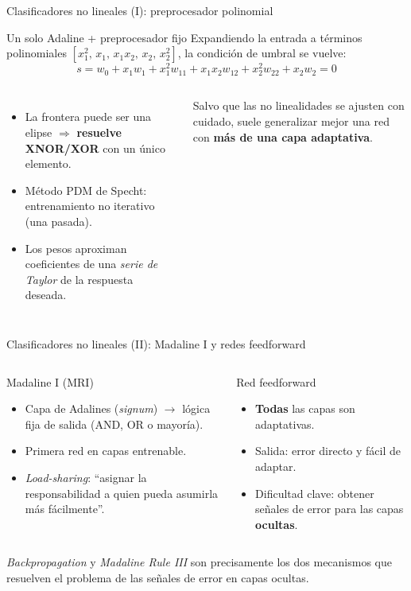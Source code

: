 \documentclass[aspectratio=169, 11pt, xcolor={dvipsnames,table}]{beamer}
\newcommand{\azul}[1]{\textcolor{UsachAzul}{#1}}
\begin{document}
\begin{frame}{Clasificadores no lineales (I): preprocesador polinomial}
\begin{block}{Un solo Adaline + preprocesador fijo}
Expandiendo la entrada a términos polinomiales $[x_1^2,\,x_1,\,x_1x_2,\,x_2,\,x_2^2]$, la condición
de umbral se vuelve:
\[
s = w_0 + x_1 w_1 + x_1^2 w_{11} + x_1 x_2 w_{12} + x_2^2 w_{22} + x_2 w_2 = 0
\]
\end{block}
\begin{columns}[T]
\begin{itemize}
  \item La frontera puede ser una \azul{elipse} $\Rightarrow$ \textbf{resuelve XNOR/XOR} con un único elemento.
  \item Método PDM de Specht: entrenamiento no iterativo (una pasada).
  \item Los pesos aproximan coeficientes de una \emph{serie de Taylor} de la respuesta deseada.
\end{itemize}
\begin{tipbox}
Salvo que las no linealidades se ajusten con cuidado, suele generalizar mejor una red con
\textbf{más de una capa adaptativa}.
\end{tipbox}
\end{columns}
\end{frame}

\begin{frame}{Clasificadores no lineales (II): Madaline I y redes feedforward}
\begin{columns}[T]
\begin{block}{Madaline I (MRI)}
\begin{itemize}
  \item Capa de Adalines (\emph{signum}) $\to$ \azul{lógica fija} de salida (AND, OR o mayoría).
  \item Primera red en capas entrenable.
  \item \emph{Load-sharing}: ``asignar la responsabilidad a quien pueda asumirla más fácilmente''.
\end{itemize}
\end{block}
\begin{block}{Red feedforward}
\begin{itemize}
  \item \textbf{Todas} las capas son adaptativas.
  \item Salida: error directo y fácil de adaptar.
  \item \alert{Dificultad clave}: obtener \azul{señales de error} para las capas \textbf{ocultas}.
\end{itemize}
\end{block}
\end{columns}
\begin{ideaclave}
\emph{Backpropagation} y \emph{Madaline Rule III} son precisamente los dos mecanismos que resuelven
el problema de las señales de error en capas ocultas.
\end{ideaclave}
\end{frame}
\end{document}
